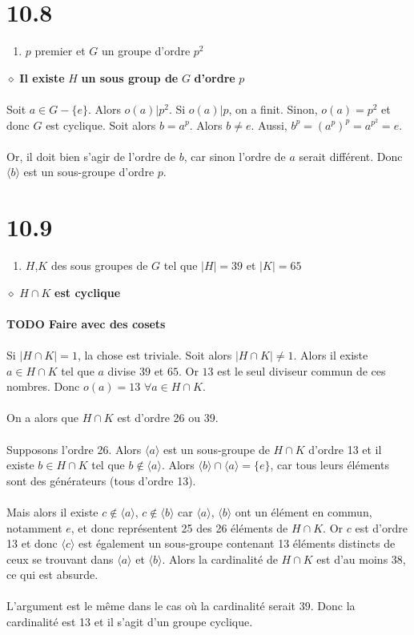 \documentclass[a4paper,10pt]{article}
\begin{document}
\section*{10.8}
\begin{enumerate}
 \item $p$ premier et $G$ un groupe d'ordre $p^2$
\end{enumerate}
$\diamond$ \textbf{Il existe } $H$ \textbf{ un sous group de } $G$ \textbf{ d'ordre } $p$
\\
\\
Soit $a \in G - \{e\}$. Alors $o(a) | p^2$. Si $o(a) | p$, on a finit. Sinon, $o(a) = p^2$
et donc $G$ est cyclique. Soit alors $b = a^p$. Alors $b \not = e$. Aussi, $b^p = (a^p)^p = a^{p^2} = e$.
\\
\\
Or, il doit bien s'agir de l'ordre de $b$, car sinon l'ordre de $a$ serait différent. Donc $ \langle b \rangle$
est un sous-groupe d'ordre $p$.

\section*{10.9}
\begin{enumerate}
 \item $H$,$K$ des sous groupes de $G$ tel que $|H| = 39$ et $|K| = 65$
\end{enumerate}
$\diamond$ $H \cap K$ \textbf{ est cyclique}
\\
\\
\textbf{TODO Faire avec des cosets}
\\
\\
Si $|H \cap K| = 1$, la chose est triviale. Soit alors $|H \cap K| \not = 1$. 
Alors il existe $a \in H \cap K$ tel que $a$ divise $39$ et $65$. Or $13$ est le 
seul diviseur commun de ces nombres. Donc $o(a) = 13$ $\forall a \in H \cap K$. 
\\
\\
On a alors que $H \cap K$ est d'ordre 26 ou 39.
\\
\\
Supposons l'ordre 26. Alors $\langle a \rangle$ est un sous-groupe de $H \cap K$ d'ordre 13
et il existe $b \in H \cap K$ tel que $b \not \in \langle a \rangle$. Alors $\langle b \rangle \cap \langle a \rangle = \{e\}$, 
car tous leurs éléments sont des générateurs (tous d'ordre 13).
\\
\\
Mais alors il existe $c \not \in \langle a \rangle$, $c \not \in \langle b \rangle$ car $\langle a \rangle$, $\langle b \rangle$ ont
un élément en commun, notamment $e$, et donc représentent 25 des 26 éléments de $H \cap K$. 
Or $c$ est d'ordre 13 et donc $\langle c \rangle$ est également un sous-groupe contenant 13
éléments distincts de ceux se trouvant dans $\langle a \rangle$ et $\langle b \rangle$. Alors la cardinalité de $H \cap K$ est d'au
moins 38, ce qui est absurde.
\\
\\
L'argument est le même dans le cas où la cardinalité serait 39. Donc la cardinalité est 13 et il s'agit d'un groupe cyclique.
\end{document}
